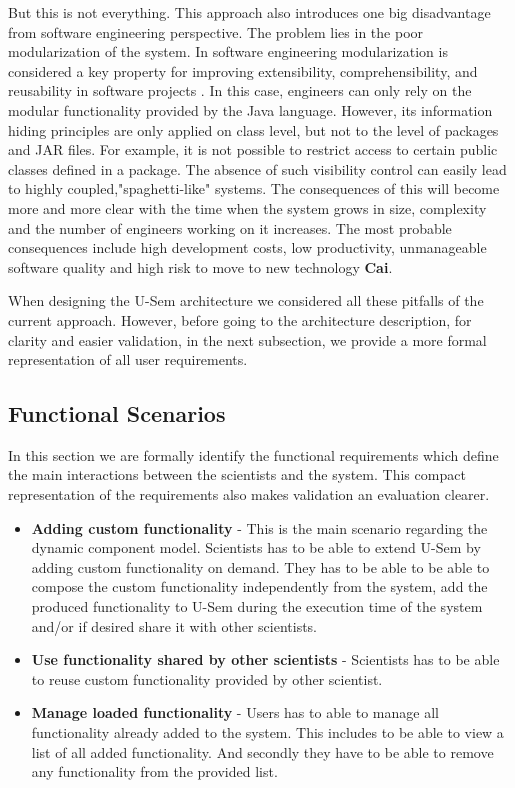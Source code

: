 But this is not everything. This approach also introduces one big disadvantage from software engineering perspective. The problem lies in the poor modularization of the system. In software engineering modularization is considered a key property for improving extensibility, comprehensibility, and reusability in software projects \cite{Parnas}. In this case, engineers can only rely on the modular functionality provided by the Java language. However, its information hiding principles are only applied on class level, but not to the level of packages and JAR files. For example, it is not possible to restrict access to certain public classes defined in a package. The absence of such visibility control can easily lead to highly coupled,"spaghetti-like" systems. The consequences of this will become more and more clear with the time when the system grows in size, complexity and the number of engineers working on it increases. The most probable consequences include high development costs, low productivity, unmanageable software quality and high risk to move to new technology \textbf{Cai}.

When designing the U-Sem architecture we considered all these pitfalls of the current approach. However, before going to the architecture description, for clarity and easier validation, in the next subsection, we provide a more formal representation of all user requirements.


\subsection{Functional Scenarios}
In this section we are formally identify the functional requirements which define the main interactions between the scientists and the system. This compact representation of the requirements also makes validation an evaluation clearer. 

\begin{itemize}

	\item \textbf{Adding custom functionality} - This is the main scenario regarding the dynamic component model. Scientists has to be able to extend U-Sem by adding custom functionality on demand. They has to be able to be able to compose the custom functionality independently from the system, add the produced functionality to U-Sem during the execution time of the system and/or if desired share it with other scientists.
	
	\item \textbf{Use functionality shared by other scientists} - Scientists has to be able to reuse custom functionality provided by other scientist.
	
	\item \textbf{Manage loaded functionality} - Users has to able to manage all functionality already added to the system. This includes to be able to view a list of all added functionality. And secondly they have to be able to remove any functionality from the provided list.
			
	
\end{itemize}

